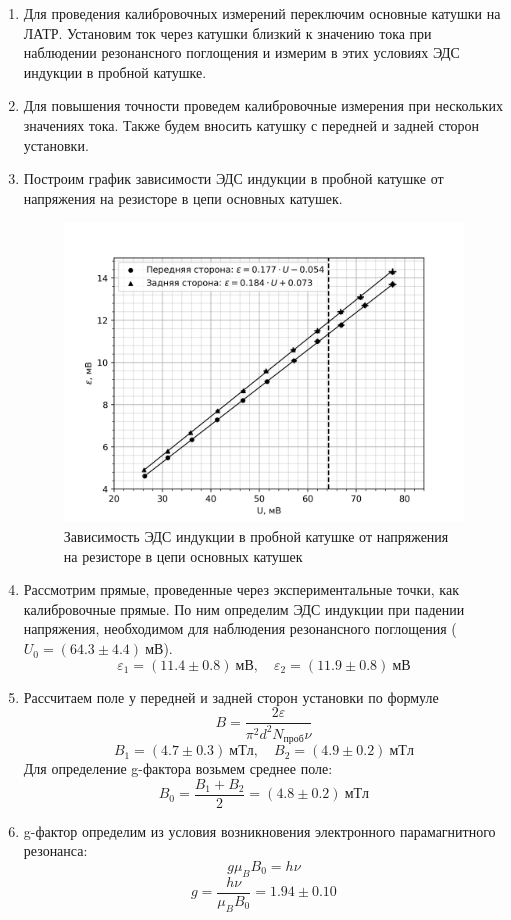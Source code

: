 \documentclass[14pt, a4paper]{report}
\begin{document}
\begin{enumerate}

\item Для проведения калибровочных измерений переключим основные катушки на ЛАТР. Установим ток через катушки близкий к значению тока при наблюдении резонансного поглощения и измерим в этих условиях ЭДС индукции в пробной катушке.

\item Для повышения точности проведем калибровочные измерения при нескольких значениях тока. Также будем вносить катушку с передней и задней сторон установки.

\item Построим график зависимости ЭДС индукции в пробной катушке от напряжения на резисторе в цепи основных катушек.

\begin{figure}[H]
\centering
\includegraphics[width=.8\linewidth]{../images/5101-1}
\caption{Зависимость ЭДС индукции в пробной катушке от напряжения на резисторе в цепи основных катушек}
\end{figure}

\item Рассмотрим прямые, проведенные через экспериментальные точки, как калибровочные прямые. По ним определим ЭДС индукции при падении напряжения, необходимом для наблюдения резонансного поглощения ($U_0=(64.3\pm4.4)\ мВ$).
\[\varepsilon_1=(11.4\pm0.8)\ мВ,\quad \varepsilon_2=(11.9\pm0.8)\ мВ\]

\item Рассчитаем поле у передней и задней сторон установки по формуле 
\[B=\frac{2\varepsilon}{\pi^2 d^2 N_{проб} \nu}\]
\[B_1=(4.7\pm0.3)\ мТл,\quad B_2=(4.9\pm0.2)\ мТл\]
Для определение g-фактора возьмем среднее поле:
\[B_0=\frac{B_1+B_2}{2}=(4.8\pm0.2)\ мТл\]

\item g-фактор определим из условия возникновения электронного парамагнитного резонанса:
\[g\mu_B B_0=h\nu\]
\[g=\frac{h\nu}{\mu_B B_0}=1.94\pm0.10\]

\end{enumerate}
\end{document}
